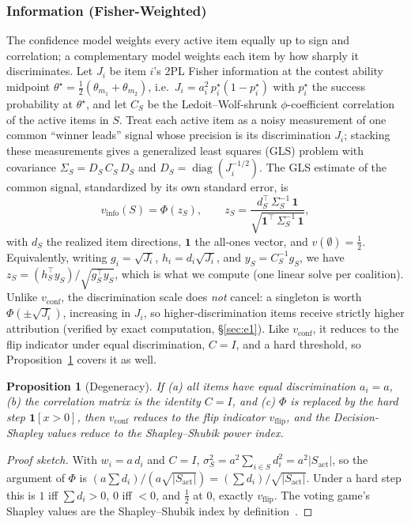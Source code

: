 \documentclass[conference]{IEEEtran}
\newtheorem{proposition}{Proposition}
\begin{document}
\subsubsection{Information (Fisher-Weighted)}
The confidence model weights every active item equally up to sign and correlation; a complementary model weights each item by how sharply it discriminates.
Let $J_i$ be item $i$'s 2PL Fisher information at the contest ability midpoint $\theta^\star=\tfrac12(\theta_{m_1}+\theta_{m_2})$, i.e.\ $J_i=a_i^2\,p_i^\star(1-p_i^\star)$ with $p_i^\star$ the success probability at $\theta^\star$, and let $C_S$ be the Ledoit--Wolf-shrunk $\phi$-coefficient correlation of the active items in $S$.
Treat each active item as a noisy measurement of one common ``winner leads'' signal whose precision is its discrimination $J_i$; stacking these measurements gives a generalized least squares (GLS) problem with covariance $\Sigma_S=D_S\,C_S\,D_S$ and $D_S=\operatorname{diag}(J_i^{-1/2})$.
The GLS estimate of the common signal, standardized by its own standard error, is
\begin{equation}
    v_{\text{info}}(S)=\Phi(z_S),\qquad
    z_S=\frac{d_S^{\top}\,\Sigma_S^{-1}\,\mathbf{1}}{\sqrt{\mathbf{1}^{\top}\,\Sigma_S^{-1}\,\mathbf{1}}},
    \label{eq:info}
\end{equation}
with $d_S$ the realized item directions, $\mathbf{1}$ the all-ones vector, and $v(\emptyset)=\tfrac12$.
Equivalently, writing $g_i=\sqrt{J_i}$, $h_i=d_i\sqrt{J_i}$, and $y_S=C_S^{-1}g_S$, we have $z_S=(h_S^{\top}y_S)/\sqrt{g_S^{\top}y_S}$, which is what we compute (one linear solve per coalition).
Unlike $v_{\text{conf}}$, the discrimination scale does \emph{not} cancel: a singleton is worth $\Phi(\pm\sqrt{J_i})$, increasing in $J_i$, so higher-discrimination items receive strictly higher attribution (verified by exact computation, \S\ref{sec:e1}).
Like $v_{\text{conf}}$, it reduces to the flip indicator under equal discrimination, $C=I$, and a hard threshold, so Proposition~\ref{prop:degeneracy} covers it as well.

\begin{proposition}[Degeneracy]
\label{prop:degeneracy}
If (a) all items have equal discrimination $a_i=a$, (b) the correlation matrix is the identity $C=I$, and (c) $\Phi$ is replaced by the hard step $\mathbf{1}[x>0]$, then $v_{\text{conf}}$ reduces to the flip indicator $v_{\text{flip}}$, and the Decision-Shapley values reduce to the Shapley--Shubik power index.
\end{proposition}
\begin{proof}[Proof sketch]
With $w_i = a\,d_i$ and $C=I$, $\sigma_S^2 = a^2\sum_{i\in S} d_i^2 = a^2 |S_{\text{act}}|$, so the argument of $\Phi$ is $(a\sum d_i)/(a\sqrt{|S_{\text{act}}|}) = (\sum d_i)/\sqrt{|S_{\text{act}}|}$.
Under a hard step this is $1$ iff $\sum d_i>0$, $0$ iff $<0$, and $\tfrac12$ at $0$, exactly $v_{\text{flip}}$.
The voting game's Shapley values are the Shapley--Shubik index by definition~\cite{shapleyshubik1954}.
\end{proof}
\end{document}
